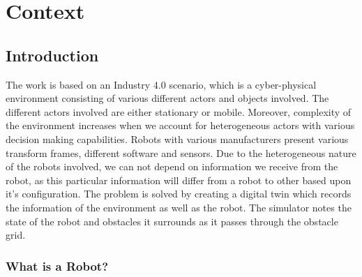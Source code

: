 
\chapter{Context} %

\label{ChapterX} %


\section{Introduction}
The work is based on an Industry 4.0 scenario, which is a cyber-physical environment consisting of various different 
actors and objects involved. The different actors involved are either stationary or mobile. Moreover, complexity of the 
environment increases when we account for heterogeneous actors with various decision making capabilities. Robots with various
manufacturers present various transform frames, different software and sensors. Due to the heterogeneous nature of the robots 
involved, we can not depend on information we receive from the robot, as this particular information will differ from a robot 
to other based upon it's configuration. The problem is solved by creating a digital twin which records the information of the 
environment as well as the robot. The simulator notes the state of the robot and obstacles it surrounds as it passes 
through the obstacle grid. 
\subsection{What is a Robot?}
